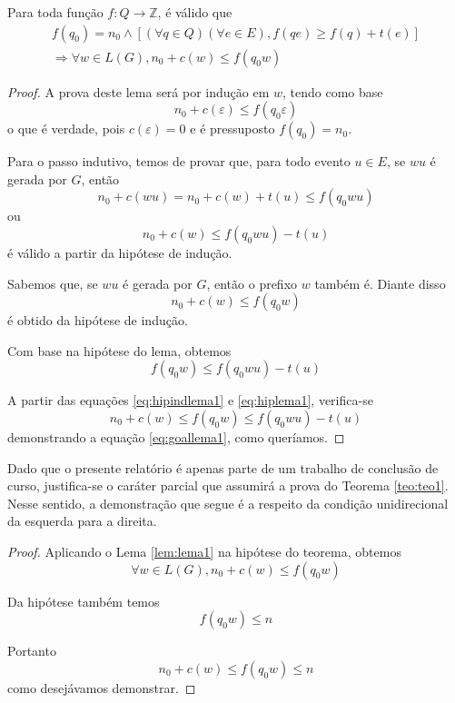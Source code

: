 \begin{lem}
	\label{lem:lema1}
	Para toda função $f : Q \to \mathbb{Z}$, é válido que\begin{equation*}
	\begin{aligned}
	f(q_0) = n_0 \wedge [(\forall q \in Q)(\forall e \in E), f(qe) \geq f(q) + t(e)]\\\Rightarrow \forall w \in L(G), n_0 + c(w) \leq f(q_0w)
	\end{aligned}
	\end{equation*}
\end{lem}
\begin{proof}
A prova deste lema será por indução em $w$, tendo como base $$n_0 + c(\varepsilon) \leq f(q_0\varepsilon)$$ o que é verdade, pois $c(\varepsilon) = 0$ e é pressuposto $f(q_0) = n_0$.

Para o passo indutivo, temos de provar que, para todo evento $u \in E$, se $ wu$ é gerada por $G$, então $$n_0 + c(wu) = n_0 + c(w) + t(u) \leq f(q_0wu)$$ ou \begin{equation}
\label{eq:goallema1}
n_0 + c(w) \leq f(q_0wu) - t(u)
\end{equation} é válido a partir da hipótese de indução.

Sabemos que, se $wu$ é gerada por $G$, então o prefixo $w$ também é. Diante disso \begin{equation}
\label{eq:hipindlema1}
n_0 + c(w) \leq f(q_0w)
\end{equation} é obtido da hipótese de indução.

Com base na hipótese do lema, obtemos \begin{equation}
\label{eq:hiplema1}
f(q_0w) \leq f(q_0wu) - t(u)
\end{equation}

A partir das equações \ref{eq:hipindlema1} e \ref{eq:hiplema1}, verifica-se $$n_0 + c(w) \leq f(q_0w) \leq f(q_0wu) - t(u)$$ demonstrando a equação \ref{eq:goallema1}, como queríamos.
\end{proof}

Dado que o presente relatório é apenas parte de um trabalho de conclusão de curso, justifica-se o caráter parcial que assumirá a prova do Teorema \ref{teo:teo1}. Nesse sentido, a demonstração que segue é a respeito da condição unidirecional da esquerda para a direita.

\begin{proof}
Aplicando o Lema \ref{lem:lema1} na hipótese do teorema, obtemos $$\forall w \in L(G), n_0 + c(w) \leq f(q_0w)$$

Da hipótese também temos $$f(q_0w) \leq n$$

Portanto $$n_0 + c(w) \leq f(q_0w) \leq n$$ como desejávamos demonstrar.
\end{proof}

